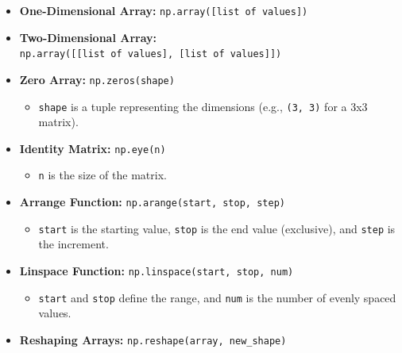 \documentclass[
  letterpaper,
  DIV=11,
  numbers=noendperiod]{scrreprt}
\providecommand{\tightlist}{%
  \setlength{\itemsep}{0pt}\setlength{\parskip}{0pt}}\usepackage{longtable,booktabs,array}
\theoremstyle{plain}
\theoremstyle{definition}
\theoremstyle{remark}
\begin{document}
\begin{tcolorbox}[enhanced jigsaw, leftrule=.75mm, bottomtitle=1mm, colback=white, toptitle=1mm, opacitybacktitle=0.6, toprule=.15mm, colbacktitle=quarto-callout-important-color!10!white, arc=.35mm, colframe=quarto-callout-important-color-frame, title=\textcolor{quarto-callout-important-color}{\faExclamation}\hspace{0.5em}{Syntax}, titlerule=0mm, rightrule=.15mm, left=2mm, bottomrule=.15mm, breakable, coltitle=black, opacityback=0]

\begin{itemize}
\tightlist
\item
  \textbf{One-Dimensional Array:}
  \texttt{np.array({[}list\ of\ values{]})}\\
\item
  \textbf{Two-Dimensional Array:}
  \texttt{np.array({[}{[}list\ of\ values{]},\ {[}list\ of\ values{]}{]})}\\
\item
  \textbf{Zero Array:} \texttt{np.zeros(shape)}

  \begin{itemize}
  \tightlist
  \item
    \texttt{shape} is a tuple representing the dimensions (e.g.,
    \texttt{(3,\ 3)} for a 3x3 matrix).
  \end{itemize}
\item
  \textbf{Identity Matrix:} \texttt{np.eye(n)}

  \begin{itemize}
  \tightlist
  \item
    \texttt{n} is the size of the matrix.
  \end{itemize}
\item
  \textbf{Arrange Function:} \texttt{np.arange(start,\ stop,\ step)}

  \begin{itemize}
  \tightlist
  \item
    \texttt{start} is the starting value, \texttt{stop} is the end value
    (exclusive), and \texttt{step} is the increment.
  \end{itemize}
\item
  \textbf{Linspace Function:} \texttt{np.linspace(start,\ stop,\ num)}

  \begin{itemize}
  \tightlist
  \item
    \texttt{start} and \texttt{stop} define the range, and \texttt{num}
    is the number of evenly spaced values.
  \end{itemize}
\item
  \textbf{Reshaping Arrays:} \texttt{np.reshape(array,\ new\_shape)}


\end{itemize}
\end{tcolorbox}
\end{document}
